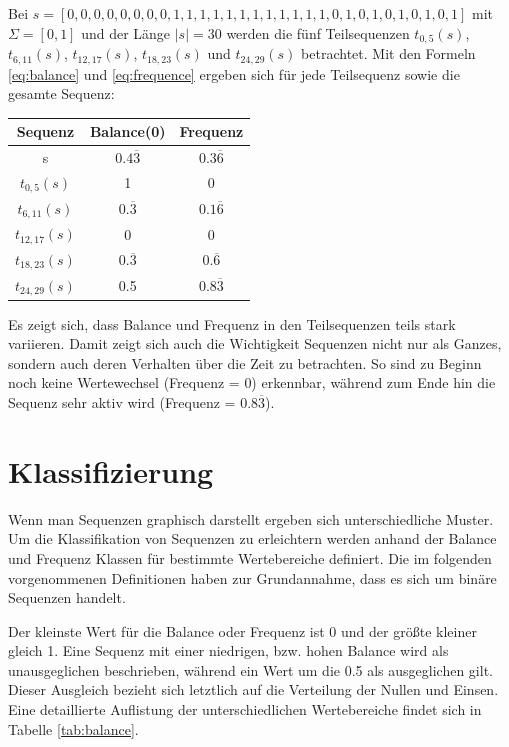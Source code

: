 \begin{theorem}
Bei $s = [0,0,0,0,0,0,0,0,1,1,1,1,1,1,1,1,1,1,1,1,0,1,0,1,0,1,0,1,0,1]$ mit $\Sigma = [0,1]$ und der Länge $|s| = 30$ werden die fünf Teilsequenzen $t_{0,5}(s)$, $t_{6,11}(s)$, $t_{12,17}(s)$, $t_{18,23}(s)$ und $t_{24,29}(s)$ betrachtet. Mit den Formeln \ref{eq:balance} und \ref{eq:frequence} ergeben sich für jede Teilsequenz sowie die gesamte Sequenz:

\begin{center}
	\begin{tabular}{|c c c|} 
		\hline
		Sequenz & Balance(0) & Frequenz \\
		\hline\hline
		s & $0.4\overline{3}$ & $0.3\overline{6}$ \\ 
		\hline
		$t_{0,5}(s)$ & 1 & 0 \\ 
		\hline
		$t_{6,11}(s)$ & $0.\overline{3}$ & $0.1\overline{6}$ \\
		\hline
		$t_{12,17}(s)$ & 0 & 0 \\
		\hline
		$t_{18,23}(s)$ & $0.\overline{3}$ & $0.\overline{6}$ \\
		\hline
		$t_{24,29}(s)$ & 0.5 & $0.8\overline{3}$ \\
		\hline
	\end{tabular}
\end{center}

Es zeigt sich, dass Balance und Frequenz in den Teilsequenzen teils stark variieren. Damit zeigt sich auch die Wichtigkeit Sequenzen nicht nur als Ganzes, sondern auch deren Verhalten über die Zeit zu betrachten. So sind zu Beginn noch keine Wertewechsel (Frequenz = 0) erkennbar, während zum Ende hin die Sequenz sehr aktiv wird (Frequenz = 0.8$\overline{3}$).
\end{theorem}

\section{Klassifizierung}
Wenn man Sequenzen graphisch darstellt ergeben sich unterschiedliche Muster. Um die Klassifikation von Sequenzen zu erleichtern werden anhand der Balance und Frequenz Klassen für bestimmte Wertebereiche definiert. Die im folgenden vorgenommenen Definitionen haben zur Grundannahme, dass es sich um binäre Sequenzen handelt.

Der kleinste Wert für die Balance oder Frequenz ist 0 und der größte kleiner gleich 1. Eine Sequenz mit einer niedrigen, bzw. hohen Balance wird als unausgeglichen beschrieben, während ein Wert um die 0.5 als ausgeglichen gilt. Dieser Ausgleich bezieht sich letztlich auf die Verteilung der Nullen und Einsen. Eine detaillierte Auflistung der unterschiedlichen Wertebereiche findet sich in Tabelle \ref{tab:balance}. 

